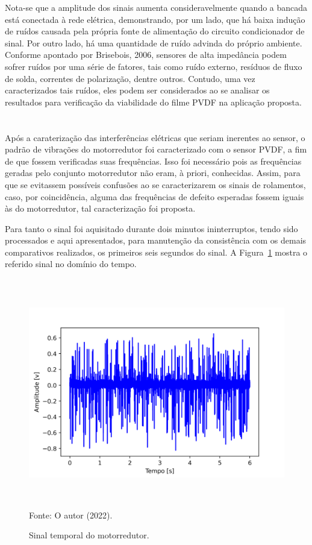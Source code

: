 \documentclass[
	12pt,				
	oneside,			
	a4paper,			
	english,			
	brazil,			
	]{abntex2ppgsi}
\begin{document}
{{{{{{{Nota-se que a amplitude dos sinais aumenta consideravelmente quando a bancada está conectada à rede elétrica, demonstrando, por um lado, que há baixa indução de ruídos causada pela própria fonte de alimentação do circuito condicionador de sinal. Por outro lado, há uma quantidade de ruído advinda do próprio ambiente. Conforme apontado por Brisebois, 2006, sensores de alta impedância podem sofrer ruídos por uma série de fatores, tais como ruído externo, resíduos de fluxo de solda, correntes de polarização, dentre outros. Contudo, uma vez caracterizados tais ruídos, eles podem ser considerados ao se analisar os resultados para verificação da viabilidade do filme PVDF na aplicação proposta.

\section{}

Após a caraterização das interferências elétricas que seriam inerentes ao sensor, o padrão de vibrações do motorredutor foi caracterizado com o sensor PVDF, a fim de que fossem verificadas suas frequências. Isso foi necessário pois as frequências geradas pelo conjunto motorredutor não eram, à priori, conhecidas. Assim, para que se evitassem possíveis confusões ao se caracterizarem os sinais de rolamentos, caso, por coincidência, alguma das frequências de defeito esperadas fossem iguais às do motorredutor, tal caracterização foi proposta. 

Para tanto o sinal foi aquisitado durante dois minutos ininterruptos, tendo sido processados e aqui apresentados, para manutenção da consistência com os demais comparativos realizados, os primeiros seis segundos do sinal. A Figura~\ref{motorredutor} mostra o referido sinal no domínio do tempo.

\begin{figure}[H]
\centering
\caption {Sinal temporal do motorredutor.}
\includegraphics[width=\textwidth,height=100mm,keepaspectratio]{aquisicao_04_motorredutor_10_03_2022_09h46min_ajustado_6s} \\
Fonte: O autor (2022).
\label{motorredutor}
\end{figure} 

}}}}}}}
\end{document}
